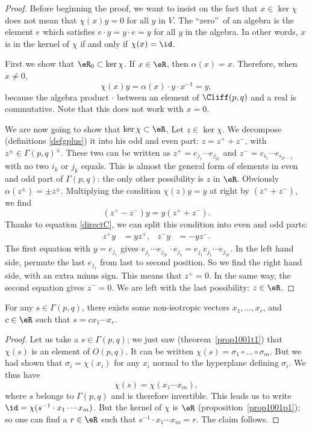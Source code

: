 \begin{proof}
Before beginning the proof, we want to insist on the fact that $x\in \ker\chi$ does not mean that $\chi(x)y=0$ for all $y$ in $V$. The ``zero''\ of an algebra is the element $e$ which satisfies $e\cdot y=y\cdot e=y$ for all $y$ in the algebra. In other words, $x$ is in the kernel of $\chi$ if and only if $\chi(x)=\id$.

First we show that $\eR_0\subset \ker\chi$. If $x\in \eR$, then $\alpha(x)=x$. Therefore, when $x\neq 0$,
\[
\chi(x)y=\alpha(x)\cdot y\cdot x^{-1}=y,
\]
because the algebra product $\cdot$ between an element of $\Cliff(p,q)$ and a real is commutative. Note that this does not work with $x=0$.

We are now going to show that $\ker\chi\subset\eR$. Let $z\in\ker\chi$. We decompose (definitions \eqref{defgplus}) it into his odd and even part: $z=z^++z^-$, with $z^{\pm}\in\Gamma(p,q)^{\pm}$. These two can be written as $z^+=e_{j_1}\cdots e_{j_{2r}}$ and $z^-=e_{i_1}\cdots e_{i_{2r-1}}$ with no two $i_k$ or $j_k$ equals. This is almost the general form of elements in even and odd part of $\Gamma(p,q)$: the only other possibility is $z$ in $\eR$. Obviously $\alpha(z^{\pm})=\pm z^{\pm}$. Multiplying the condition $\chi(z)y=y$ at right by $(z^++z^-)$, we find \[(z^+-z^-)y=y(z^++z^-).\] Thanks to equation \eqref{directC}, we can split this condition into even and odd parts:
\begin{align}
 z^+y&=yz^+,
 &z^-y&=-yz^-.
\end{align}
The first equation with $y=e_{j_1}$ gives $e_{j_1}\cdots e_{j_{2r}}\cdot e_{j_1}=e_{j_1}e_{j_1}\cdots e_{j_{2r}}$. In the left hand side, permute the last $e_{j_1}$ from last to second position. So we find the right hand side, with an extra minus sign. This means that $z^+=0$. In the same way, the second equation gives $z^-=0$. We are left with the last possibility: $z\in\eR$.
\end{proof}

\begin{corollary}
For any $s\in\Gamma(p,q)$, there exists some non-isotropic vectors $x_1,\ldots,x_r$, and $c\in\eR$ such that $s=cx_1\cdots x_r$.
\label{602c1}
\end{corollary}

\begin{proof}
Let us take a $s\in\Gamma(p,q)$; we just saw (theorem~\ref{prop1001t1}) that $\chi(s)$ is an element of $O(p,q)$. It can be written $\chi(s)=\sigma_1\circ\ldots\circ\sigma_m$. But we had shown that $\sigma_i=\chi(x_i)$ for any $x_i$ normal to the hyperplane defining $\sigma_i$. We thus have
\[
     \chi(s)=\chi(x_1\cdots x_m),
\]
where $s$ belongs to $\Gamma(p,q)$ and is therefore invertible. This leads us to write $\id=\chi(s^{-1}\cdot x_1\cdots x_m)$. But the kernel of $\chi$ is $\eR$ (proposition~\ref{prop1001p1}); so one can find a $r\in\eR$ such that $s^{-1}\cdot x_1\cdots x_m=r$. The claim follows.
\end{proof}

